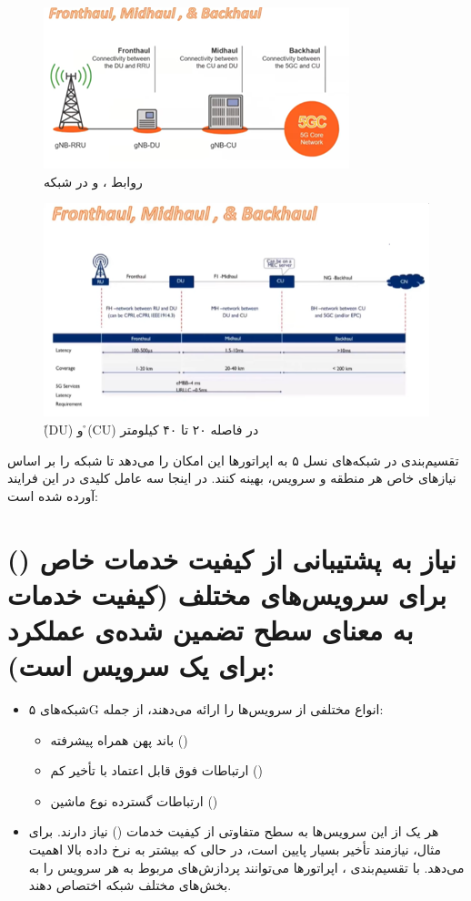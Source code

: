 \documentclass[landscape, 12pt]{report}
\begin{document}
\begin{figure}[ht]
	\centering
	\includegraphics[width=.6\linewidth]{Pic/Fronthaul_Midhaul_Backhaul}
	\caption{ روابط
		،
		و 
		در شبکه
	}
	\label{fig:Fronthaul_Midhaul_Backhaul}
\end{figure}

\begin{figure}[ht]
	\centering
	\includegraphics[width=.6\linewidth]{Pic/DUI}
	\caption{  \r{(DU)} و   \r{(CU)}  در فاصله ۲۰ تا ۴۰ کیلومتر
	}
	\label{fig:Fronthaul_Midhaul_Backhaul}
\end{figure}

تقسیم‌بندی  در شبکه‌های نسل ۵ به اپراتورها این امکان را می‌دهد تا شبکه را بر اساس نیازهای خاص هر منطقه و سرویس، بهینه کنند. در اینجا سه عامل کلیدی در این فرایند آورده شده است:

\section*{ نیاز به پشتیبانی از کیفیت خدمات خاص () برای سرویس‌های مختلف (کیفیت خدمات به معنای سطح تضمین شده‌ی عملکرد برای یک سرویس است):}

\begin{itemize}
    \item شبکه‌های ۵G انواع مختلفی از سرویس‌ها را ارائه می‌دهند، از جمله:
    \begin{itemize}
        \item باند پهن همراه پیشرفته ()
        \item ارتباطات فوق قابل اعتماد با تأخیر کم ()
        \item ارتباطات گسترده نوع ماشین ()
    \end{itemize}
    \item هر یک از این سرویس‌ها به سطح متفاوتی از کیفیت خدمات () نیاز دارند. برای مثال،  نیازمند تأخیر بسیار پایین است، در حالی که  بیشتر به نرخ داده بالا اهمیت می‌دهد. با تقسیم‌بندی ، اپراتورها می‌توانند پردازش‌های مربوط به هر سرویس را به بخش‌های مختلف شبکه اختصاص دهند.
\end{itemize}
\end{document}
